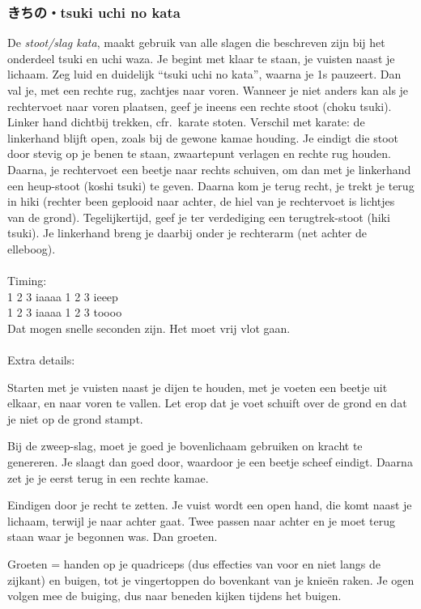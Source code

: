 \subsubsection{きちの・tsuki uchi no kata}
De \textit{stoot/slag kata}, maakt gebruik van alle slagen die beschreven zijn bij het onderdeel tsuki en uchi waza. Je begint met klaar te staan, je vuisten naast je lichaam. Zeg luid en duidelijk ``tsuki uchi no kata'', waarna je 1s pauzeert. Dan val je, met een rechte rug, zachtjes naar voren. Wanneer je niet anders kan als je rechtervoet naar voren plaatsen, geef je ineens een rechte stoot (choku tsuki). Linker hand dichtbij trekken, cfr.\ karate stoten. Verschil met karate: de linkerhand blijft open, zoals bij de gewone kamae houding. Je eindigt die stoot door stevig op je benen te staan, zwaartepunt verlagen en rechte rug houden. Daarna, je rechtervoet een beetje naar rechts schuiven, om dan met je linkerhand een heup-stoot (koshi tsuki) te geven. Daarna kom je terug recht, je trekt je terug in hiki (rechter been geplooid naar achter, de hiel van je rechtervoet is lichtjes van de grond). Tegelijkertijd, geef je ter verdediging een terugtrek-stoot (hiki tsuki). Je linkerhand breng je daarbij onder je rechterarm (net achter de elleboog).\\
\\
Timing:\\
1 2 3 iaaaa 1 2 3 ieeep\\
1 2 3 iaaaa 1 2 3 toooo\\
Dat mogen snelle seconden zijn. Het moet vrij vlot gaan.\\
\\
Extra details:
\begin{itemize}
    \begin{item}
    Starten met je vuisten naast je dijen te houden, met je voeten een beetje uit elkaar, en naar voren te vallen. Let erop dat je voet schuift over de grond en dat je niet op de grond stampt.
    \end{item}
    \begin{item}
    Bij de zweep-slag, moet je goed je bovenlichaam gebruiken on kracht te genereren. Je slaagt dan goed door, waardoor je een beetje scheef eindigt. Daarna zet je je eerst terug in een rechte kamae.
    \end{item}
    \begin{item}
    Eindigen door je recht te zetten. Je vuist wordt een open hand, die komt naast je lichaam, terwijl je naar achter gaat. Twee passen naar achter en je moet terug staan waar je begonnen was. Dan groeten.
    \end{item}
    \begin{item}
    Groeten = handen op je quadriceps (dus effecties van voor en niet langs de zijkant) en buigen, tot je vingertoppen do bovenkant van je knie\"{e}n raken.
    Je ogen volgen mee de buiging, dus naar beneden kijken tijdens het buigen.
    \end{item}
\end{itemize}
